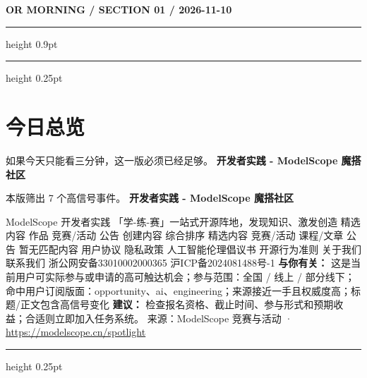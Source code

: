 \documentclass[10.5pt]{ctexart}
\begin{document}
{\small\bfseries OR MORNING / SECTION 01 / 2026-11-10}
\vspace{2mm}
\hrule height 0.9pt
\vspace{1.5mm}
\hrule height 0.25pt
\vspace{4mm}
\section*{今日总览}
{\color{ormuted} 如果今天只能看三分钟，这一版必须已经足够。}
\vspace{2mm}
{\fontsize{25}{29}\selectfont\bfseries 开发者实践 - ModelScope 魔搭社区}\par
\vspace{2mm}
{\large 本版筛出 7 个高信号事件。}
\vspace{3mm}
{\Large\bfseries 开发者实践 - ModelScope 魔搭社区}\par
ModelScope 开发者实践 「学-练-赛」一站式开源阵地，发现知识、激发创造 精选内容 作品 竞赛/活动 公告 创建内容 综合排序 精选内容 竞赛/活动 课程/文章 公告 暂无匹配内容 用户协议 隐私政策 人工智能伦理倡议书 开源行为准则 关于我们 联系我们 浙公网安备33010002000365 沪ICP备2024081488号-1
\textbf{与你有关：} 这是当前用户可实际参与或申请的高可触达机会；参与范围：全国 / 线上 / 部分线下；命中用户订阅版面：opportunity、ai、engineering；来源接近一手且权威度高；标题/正文包含高信号变化
\textbf{建议：} 检查报名资格、截止时间、参与形式和预期收益；合适则立即加入任务系统。
{\footnotesize\color{ormuted} 来源：ModelScope 竞赛与活动 · \url{https://modelscope.cn/spotlight}}
\vspace{3mm}
\hrule height 0.25pt
\vspace{3mm}
\end{document}
